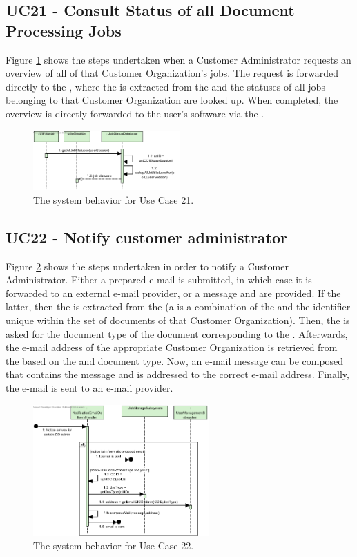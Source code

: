 \subsection{UC21 - Consult Status of all Document Processing Jobs}
Figure \ref{fig:seq_uc21} shows the steps undertaken when a Customer Administrator requests an overview of all of that Customer Organization's jobs. The request is forwarded directly to the , where the  is extracted from the  and the statuses of all jobs belonging to that Customer Organization are looked up. When completed, the overview is directly forwarded to the user's software via the .

\begin{figure}[!htp]
    \centering
    \includegraphics[width=0.5\textwidth]{figures/UC21 - Consult Status of all Document Processing Jobs.png}
    \caption{The system behavior for Use Case 21.
        }\label{fig:seq_uc21}
\end{figure}

\subsection{UC22 - Notify customer administrator}
Figure \ref{fig:seq_uc22} shows the steps undertaken in order to notify a Customer Administrator. Either a prepared e-mail is submitted, in which case it is forwarded to an external e-mail provider, or a message and  are provided. If the latter, then the  is extracted from the  (a  is a combination of the  and the identifier unique within the set of documents of that Customer Organization). Then, the  is asked for the document type of the document corresponding to the . Afterwards, the e-mail address of the appropriate Customer Organization is retrieved from the  based on the  and document type. Now, an e-mail message can be composed that contains the message and is addressed to the correct e-mail address. Finally, the e-mail is sent to an e-mail provider.

\begin{figure}[!htp]
    \centering
    \includegraphics[width=0.6\textwidth]{figures/UC22 - Notify CO administrator.png}
    \caption{The system behavior for Use Case 22.
        }\label{fig:seq_uc22}
\end{figure}